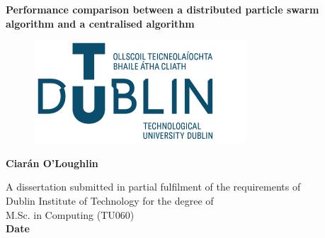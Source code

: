 \documentclass[oneside,12pt]{book}
\begin{document}
\begin{titlepage}
    \begin{center}
        \vspace*{1.5cm}
        \Huge
        \textbf{Performance comparison between a distributed particle swarm algorithm and a centralised algorithm}
        
        \vspace{0.5cm}
        \begin{figure}[H]
    	\centering
    	\hspace{7mm} \includegraphics[scale=0.5]{TU_logo}
        \end{figure}
        
        \vspace{1.5cm}
        
        \textbf{Ciarán O'Loughlin}
        
        \vfill
       \large
        A dissertation submitted in partial fulfilment of the requirements of\\
	Dublin Institute of Technology for the degree of\\
	M.Sc. in Computing (TU060)\\
       \vspace{0.5cm}
        \textbf{Date}
        \vspace{0.8cm}
 
    \end{center}
\end{titlepage}

\pagestyle{fancy}
\fancyhf{}
\fancyfoot[CE,CO]{\thepage}
\renewcommand{\headrulewidth}{0pt}




\end{document}
